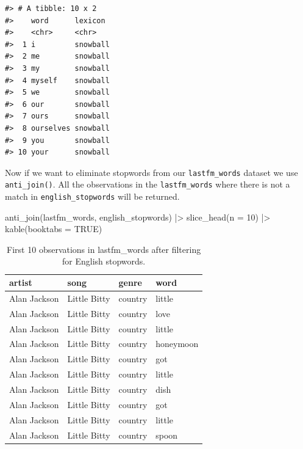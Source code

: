 \documentclass[
  letterpaper,
]{scrbook}
\newenvironment{Shaded}{\begin{snugshade}}{\end{snugshade}}
\newcommand{\AttributeTok}[1]{\textcolor[rgb]{0.00,0.00,0.00}{#1}}
\newcommand{\ConstantTok}[1]{\textcolor[rgb]{0.00,0.00,0.00}{#1}}
\newcommand{\DecValTok}[1]{\textcolor[rgb]{0.00,0.00,0.00}{#1}}
\newcommand{\FunctionTok}[1]{\textcolor[rgb]{0.00,0.00,0.00}{#1}}
\newcommand{\NormalTok}[1]{\textcolor[rgb]{0.00,0.00,0.00}{#1}}
\newcommand{\SpecialCharTok}[1]{\textcolor[rgb]{0.00,0.00,0.00}{#1}}
\begin{document}
\begin{verbatim}
#> # A tibble: 10 x 2
#>    word      lexicon 
#>    <chr>     <chr>   
#>  1 i         snowball
#>  2 me        snowball
#>  3 my        snowball
#>  4 myself    snowball
#>  5 we        snowball
#>  6 our       snowball
#>  7 ours      snowball
#>  8 ourselves snowball
#>  9 you       snowball
#> 10 your      snowball
\end{verbatim}

Now if we want to eliminate stopwords from our \texttt{lastfm\_words}
dataset we use \texttt{anti\_join()}. All the observations in the
\texttt{lastfm\_words} where there is not a match in
\texttt{english\_stopwords} will be returned.

\begin{Shaded}
\begin{Highlighting}[]
\FunctionTok{anti\_join}\NormalTok{(lastfm\_words, english\_stopwords) }\SpecialCharTok{|\textgreater{}} 
  \FunctionTok{slice\_head}\NormalTok{(}\AttributeTok{n =} \DecValTok{10}\NormalTok{) }\SpecialCharTok{|\textgreater{}} 
  \FunctionTok{kable}\NormalTok{(}\AttributeTok{booktabs =} \ConstantTok{TRUE}\NormalTok{)}
\end{Highlighting}
\end{Shaded}

\hypertarget{tbl-td-lastfm-words-stopwords-anti-join}{}
\begin{table}
\caption{\label{tbl-td-lastfm-words-stopwords-anti-join}First 10 observations in lastfm\_words after filtering for English
stopwords. }\tabularnewline

\centering
\begin{tabular}{llll}
\toprule
artist & song & genre & word\\
\midrule
Alan Jackson & Little Bitty & country & little\\
Alan Jackson & Little Bitty & country & love\\
Alan Jackson & Little Bitty & country & little\\
Alan Jackson & Little Bitty & country & honeymoon\\
Alan Jackson & Little Bitty & country & got\\
\addlinespace
Alan Jackson & Little Bitty & country & little\\
Alan Jackson & Little Bitty & country & dish\\
Alan Jackson & Little Bitty & country & got\\
Alan Jackson & Little Bitty & country & little\\
Alan Jackson & Little Bitty & country & spoon\\
\bottomrule
\end{tabular}
\end{table}
\end{document}
